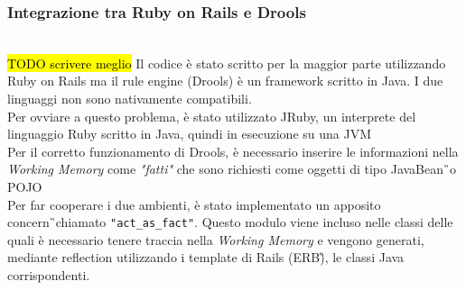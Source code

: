 \subsubsection{Integrazione tra Ruby on Rails e Drools}\mbox{} \\
\hl{TODO scrivere meglio}
Il codice è stato scritto per la maggior parte utilizzando Ruby on Rails ma il rule engine (Drools) è un framework scritto in Java. I due linguaggi non sono nativamente compatibili. \\
Per ovviare a questo problema, è stato utilizzato JRuby, un interprete del linguaggio Ruby scritto in Java, quindi in esecuzione su una \gls{JVM}\G\. \\
Per il corretto funzionamento di Drools, è necessario inserire le informazioni nella \textit{Working Memory} come \textit{"fatti"} che sono richiesti come oggetti di tipo \gls{JavaBean}\G\ o \gls{POJO}\G\.\\
Per far cooperare i due ambienti, è stato implementato un apposito  \gls{concern}\G\ chiamato \texttt{"act\_as\_fact"}. Questo modulo viene incluso nelle classi delle quali è necessario tenere traccia nella \textit{Working Memory} e vengono generati, mediante reflection utilizzando i template di Rails (\gls{ERB}\G), le classi Java corrispondenti.








